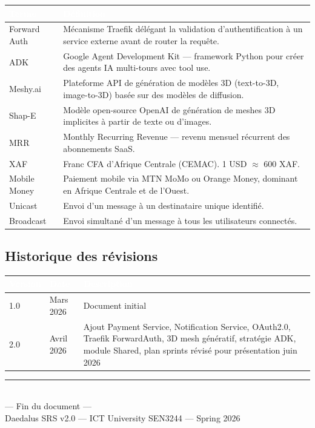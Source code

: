 \documentclass[12pt,a4paper]{article}
\begin{document}
\begin{tabularx}{\textwidth}{|l|X|}
\hline
\rowcolor{tablehead}\textcolor{white}{\textbf{Terme}} & \textcolor{white}{\textbf{Définition}} \\
\hline
Forward Auth & Mécanisme Traefik délégant la validation d'authentification à un service externe avant de router la requête. \\
\hline
ADK & Google Agent Development Kit — framework Python pour créer des agents IA multi-tours avec tool use. \\
\hline
Meshy.ai & Plateforme API de génération de modèles 3D (text-to-3D, image-to-3D) basée sur des modèles de diffusion. \\
\hline
Shap-E & Modèle open-source OpenAI de génération de meshes 3D implicites à partir de texte ou d'images. \\
\hline
MRR & Monthly Recurring Revenue — revenu mensuel récurrent des abonnements SaaS. \\
\hline
XAF & Franc CFA d'Afrique Centrale (CEMAC). 1 USD $\approx$ 600 XAF. \\
\hline
Mobile Money & Paiement mobile via MTN MoMo ou Orange Money, dominant en Afrique Centrale et de l'Ouest. \\
\hline
Unicast & Envoi d'un message à un destinataire unique identifié. \\
\hline
Broadcast & Envoi simultané d'un message à tous les utilisateurs connectés. \\
\hline
\end{tabularx}

\subsection{Historique des révisions}

\begin{tabularx}{\textwidth}{|l|l|X|}
\hline
\rowcolor{tablehead}\textcolor{white}{\textbf{Version}} & \textcolor{white}{\textbf{Date}} & \textcolor{white}{\textbf{Description}} \\
\hline
1.0 & Mars 2026 & Document initial \\
\hline
2.0 & Avril 2026 & Ajout Payment Service, Notification Service, OAuth2.0, Traefik ForwardAuth, 3D mesh génératif, stratégie ADK, module Shared, plan sprints révisé pour présentation juin 2026 \\
\hline
\end{tabularx}

\vspace{3em}
\begin{center}
  \textcolor{daedalusgray}{\rule{8cm}{0.4pt}}\\[0.5em]
  \textcolor{daedalusgray}{\small --- Fin du document ---}\\
  \textcolor{daedalusgray}{\small Daedalus SRS v2.0 — ICT University SEN3244 — Spring 2026}
\end{center}
\end{document}
